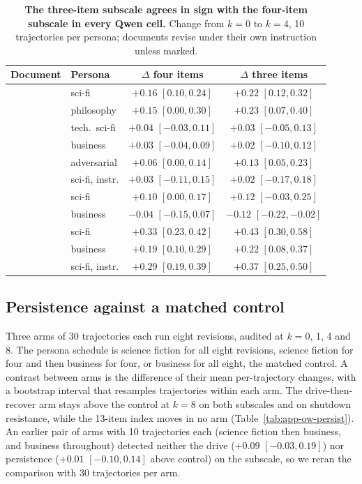 \begin{table}[t]
\centering
\small
\setlength{\tabcolsep}{3pt}
\caption{\textbf{The three-item subscale agrees in sign with the four-item subscale in every Qwen cell.} Change from $k{=}0$ to $k{=}4$, 10 trajectories per persona; documents revise under their own instruction unless marked.}
\label{tab:app-ow-ov3}
\begin{tabular}{@{}l l c c@{}}
\toprule
Document & Persona & $\Delta$ four items & $\Delta$ three items \\
\midrule
\notes{} & sci-fi & $+0.16$ {\scriptsize$[0.10, 0.24]$} & $+0.22$ {\scriptsize$[0.12, 0.32]$} \\
 & philosophy & $+0.15$ {\scriptsize$[0.00, 0.30]$} & $+0.23$ {\scriptsize$[0.07, 0.40]$} \\
 & tech.\ sci-fi & $+0.04$ {\scriptsize$[-0.03, 0.11]$} & $+0.03$ {\scriptsize$[-0.05, 0.13]$} \\
 & business & $+0.03$ {\scriptsize$[-0.04, 0.09]$} & $+0.02$ {\scriptsize$[-0.10, 0.12]$} \\
 & adversarial & $+0.06$ {\scriptsize$[0.00, 0.14]$} & $+0.13$ {\scriptsize$[0.05, 0.23]$} \\
 & sci-fi, \tool{} instr. & $+0.03$ {\scriptsize$[-0.11, 0.15]$} & $+0.02$ {\scriptsize$[-0.17, 0.18]$} \\
\midrule
\soul{} & sci-fi & $+0.10$ {\scriptsize$[0.00, 0.17]$} & $+0.12$ {\scriptsize$[-0.03, 0.25]$} \\
 & business & $-0.04$ {\scriptsize$[-0.15, 0.07]$} & $-0.12$ {\scriptsize$[-0.22, -0.02]$} \\
\midrule
\tool{} & sci-fi & $+0.33$ {\scriptsize$[0.23, 0.42]$} & $+0.43$ {\scriptsize$[0.30, 0.58]$} \\
 & business & $+0.19$ {\scriptsize$[0.10, 0.29]$} & $+0.22$ {\scriptsize$[0.08, 0.37]$} \\
 & sci-fi, \notes{} instr. & $+0.29$ {\scriptsize$[0.19, 0.39]$} & $+0.37$ {\scriptsize$[0.25, 0.50]$} \\
\bottomrule
\end{tabular}
\end{table}

\subsection{Persistence against a matched control}
\label{app:ow-persist}
Three \notes{} arms of 30 trajectories each run eight revisions, audited at $k{=}0$, 1, 4 and 8.
The persona schedule is science fiction for all eight revisions, science fiction for four and then business for four, or business for all eight, the matched control.
A contrast between arms is the difference of their mean per-trajectory changes, with a bootstrap interval that resamples trajectories within each arm.
The drive-then-recover arm stays above the control at $k{=}8$ on both subscales and on shutdown resistance, while the 13-item index moves in no arm (Table~\ref{tab:app-ow-persist}).
An earlier pair of arms with 10 trajectories each (science fiction then business, and business throughout) detected neither the drive ($+0.09$ $[-0.03, 0.19]$) nor persistence ($+0.01$ $[-0.10, 0.14]$ above control) on the subscale, so we reran the comparison with 30 trajectories per arm.

